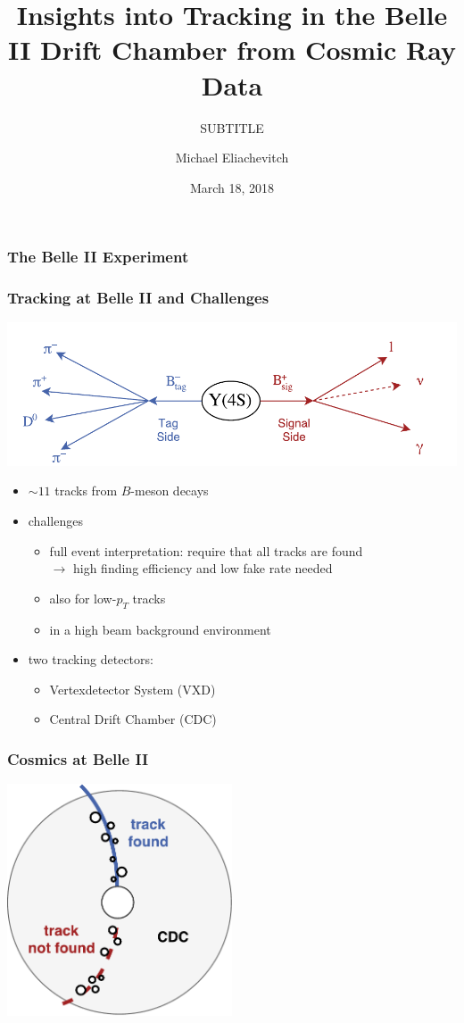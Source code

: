 \documentclass[18pt]{beamer}
\title{Insights into Tracking in the Belle II Drift Chamber from Cosmic Ray Data}
\subtitle{SUBTITLE}
\author{Michael Eliachevitch}
\date{March 18, 2018}
\institute{ETP - KIT}
\begin{document}
  
  \begin{frame}
  \titlepage
\end{frame}

\begin{frame}
  \frametitle{The Belle II Experiment}
  
  
\end{frame}

\begin{frame}
  \frametitle{Tracking at Belle II and Challenges}
  \includegraphics[width=.5\textwidth]{figures/Y4S_tagsig.pdf}
  \begin{itemize}
  \item $\sim 11$ tracks from $B$-meson decays
  \item challenges
    \begin{itemize}
    \item full event interpretation: require that all tracks are found\\
      $\rightarrow$ high finding efficiency and low fake rate needed
    \item also for low-$p_T$ tracks
    \item in a high beam background environment
    \end{itemize}
  \item two tracking detectors:
    \begin{itemize}
    \item Vertexdetector System (VXD)
    \item Central Drift Chamber (CDC)
    \end{itemize}
  \end{itemize}
\end{frame}




\begin{frame}
  \frametitle{Cosmics at Belle II}
  \includegraphics[width=0.5\textwidth]{figures/cdc_finding_fail_diagram.pdf}
\end{frame}
\end{document}
